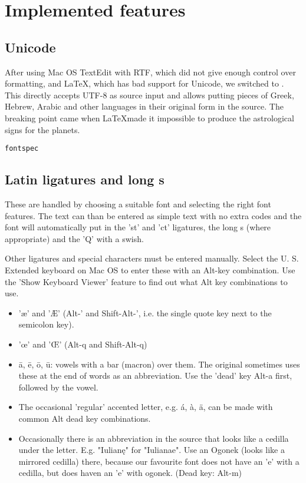 \documentclass{report}
\begin{document}
\chapter{Implemented features}
\section{Unicode}
After using Mac OS TextEdit with RTF, which did not give enough control over formatting, and \LaTeX, which
has bad support for Unicode, we switched to \XeLaTeX. This directly accepts UTF-8 as source input and allows
putting pieces of Greek, Hebrew, Arabic and other languages in their original form in the source. The breaking point
came when \LaTeX  made it impossible to produce the astrological signs for the planets.

\texttt{fontspec}

\section{Latin ligatures and long s}
These are handled by choosing a suitable font and selecting the right font features. The text can than be entered
as simple text with no extra codes and the font will automatically put in the 'st' and 'ct' ligatures, the long s (where
appropriate) and the 'Q' with a swish.

Other ligatures and special characters must be entered manually. Select the U. S. Extended keyboard on Mac OS
to enter these with an Alt-key combination. Use the 'Show Keyboard Viewer' feature to find out what Alt key combinations
to use.
\begin{itemize}
\item 'æ' and 'Æ' (Alt-' and Shift-Alt-', i.e. the single quote key next to the semicolon key).
\item 'œ' and 'Œ' (Alt-q and Shift-Alt-q)
\item ā, ē, ō, ū: vowels with a bar (macron) over them. The original sometimes uses these at the end of words
as an abbreviation. Use the 'dead' key Alt-a first, followed by the vowel.
\item The occasional 'regular' accented letter, e.g. á, à, ä, can be made with common Alt dead key combinations.
\item Occasionally there is an abbreviation in the source that looks like a cedilla under the letter. E.g. "Iulianę" for "Iulianae".
Use an Ogonek (looks like a mirrored cedilla) there, because our favourite font does not have an 'e' with a cedilla, but
does haven an 'e' with ogonek. (Dead key: Alt-m)
\end{itemize}
\end{document}
